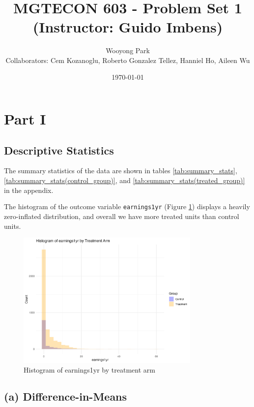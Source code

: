 \documentclass[11pt]{article}
\title{MGTECON 603 - Problem Set 1\\ \small{(Instructor: Guido Imbens)}}
\author{Wooyong Park\\ {\small Collaborators: Cem Kozanoglu, Roberto Gonzalez Tellez, Hanniel Ho, Aileen Wu}}
\date{\today}
\numberwithin{equation}{section}
\begin{document}
\maketitle

\section{Part I}

\subsection*{Descriptive Statistics}

The summary statistics of the data are shown in tables \ref{tab:summary_stats}, \ref{tab:summary_stats(control_group)}, and \ref{tab:summary_stats(treated_group)} in the appendix.

The histogram of the outcome variable \verb|earnings1yr| (Figure \ref{fig:hist_earnings1yr}) displays a heavily zero-inflated distribution, and overall we have more treated units than control units.

\begin{figure}[h]
    \centering
    \includegraphics[width=0.8\textwidth]{output/histogram_earnings1yr_by_treatment_arm.png}
    \caption{\label{fig:hist_earnings1yr}Histogram of earnings1yr by treatment arm}
\end{figure}





\subsection*{(a) Difference-in-Means}
\end{document}
